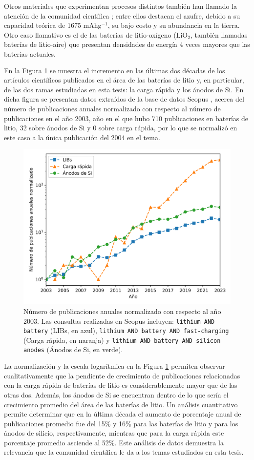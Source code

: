 Otros materiales que experimentan procesos distintos también han llamado la 
atención de la comunidad científica \cite{nitta2015}; entre ellos destacan el 
azufre, debido a su capacidad teórica de 1675 mAhg$^{-1}$, su bajo costo y su 
abundancia en la tierra. Otro caso llamativo es el de las baterías de 
litio-oxígeno (LiO$_2$, también llamadas baterías de litio-aire) que presentan 
densidades de energía 4 veces mayores que las baterías actuales.

En la Figura \ref{fig:scopus} se muestra el incremento en las últimas dos décadas
de los artículos científicos publicados en el área de las baterías de litio y, en 
particular, de las dos ramas estudiadas en esta tesis: la carga rápida y los 
ánodos de Si. En dicha figura se presentan datos extraídos de la base de datos 
Scopus \cite{SCOPUS}, acerca del número de publicaciones anuales normalizado con respecto 
al número de publicaciones en el año 2003, año en el que hubo 710 publicaciones 
en baterías de litio, 32 sobre ánodos de Si y 0 sobre carga rápida, por lo que 
se normalizó en este caso a la única publicación del 2004 en el tema.
\begin{figure}[h!]
    \centering
    \includegraphics[width=.8\textwidth]{Introduccion/baterias/scopus.png}
    \caption{Número de publicaciones anuales normalizado con respecto al año 2003. 
    Las consultas realizadas en Scopus \cite{SCOPUS} incluyen: 
    \texttt{lithium AND battery} (LIBs, en azul), \texttt{lithium AND battery AND 
    fast-charging} (Carga rápida, en naranja) y \texttt{lithium AND battery AND 
    silicon anodes} (Ánodos de Si, en verde).}
    \label{fig:scopus}
\end{figure}
La normalización y la escala logarítmica en la Figura \ref{fig:scopus} permiten
observar cualitativamente que la pendiente de crecimiento de publicaciones 
relacionadas con la carga rápida de baterías de litio es considerablemente mayor que 
de las otras dos. Además, los ánodos de Si se encuentran dentro de lo que sería
el crecimiento promedio del área de las baterías de litio. Un análisis 
cuantitativo permite determinar que en la última década el aumento de porcentaje
anual de publicaciones promedio fue del 15\% y 16\% para las baterías de litio 
y para los ánodos de silicio, respectivamente, mientras que para la carga rápida 
este porcentaje promedio asciende al 52\%. Este análisis de datos demuestra la relevancia
que la comunidad científica le da a los temas estudiados en esta tesis.
